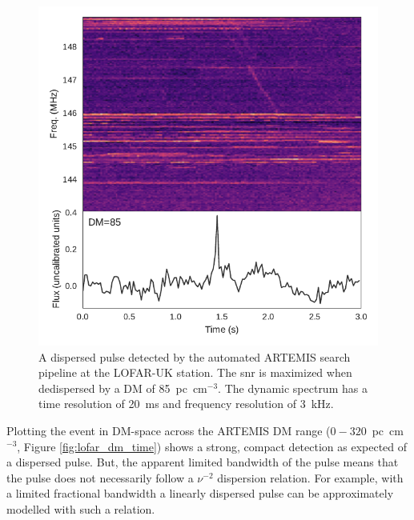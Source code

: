 \documentclass[a4paper,fleqn,usenatbib]{mnras}
\begin{document}
\begin{figure}
    \includegraphics[width=1.0\linewidth]{figures/LOFAR_dynamic.pdf}
    \caption{A dispersed pulse detected by the automated ARTEMIS search pipeline
    at the LOFAR-UK station. The \gls{snr} is maximized when dedispersed by a DM
    of 85~pc~cm$^{-3}$. The dynamic spectrum has a time resolution of 20~ms and
    frequency resolution of 3~kHz.
    }
    \label{fig:lofar_dynamic}
\end{figure}

Plotting the event in DM-space across the ARTEMIS DM range
($0-320$~pc~cm$^{-3}$, Figure \ref{fig:lofar_dm_time}) shows a strong, compact
detection as expected of a dispersed pulse. But, the apparent limited bandwidth
of the pulse means that the pulse does not necessarily follow a $\nu^{-2}$
dispersion relation. For example, with a limited fractional bandwidth a linearly
dispersed pulse can be approximately modelled with such a relation.
\end{document}
